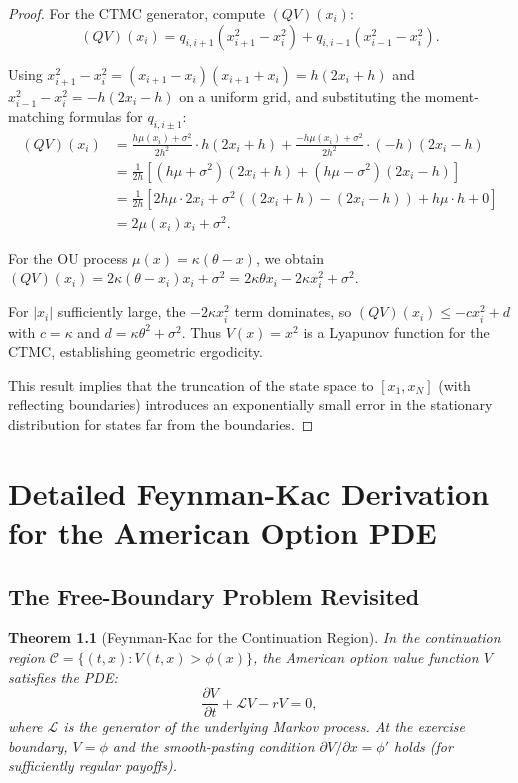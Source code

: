 \documentclass[11pt,a4paper,openany]{book}
\theoremstyle{definition}
\theoremstyle{plain}
\newtheorem{theorem}{Theorem}[chapter]
\theoremstyle{remark}
\newcommand{\1}{\mathbbm{1}}
\newcommand{\calL}{\mathcal{L}}
\newcommand{\calC}{\mathcal{C}}
\begin{document}
\begin{proof}
For the CTMC generator, compute $(Q V)(x_{i})$:
\[
(QV)(x_{i}) = q_{i,i+1}(x_{i+1}^{2} - x_{i}^{2}) + q_{i,i-1}(x_{i-1}^{2} - x_{i}^{2}).
\]

Using $x_{i+1}^{2} - x_{i}^{2} = (x_{i+1} - x_{i})(x_{i+1} + x_{i}) = h(2x_{i} + h)$ and $x_{i-1}^{2} - x_{i}^{2} = -h(2x_{i} - h)$ on a uniform grid, and substituting the moment-matching formulas for $q_{i,i\pm 1}$:
\[
\begin{aligned}
(QV)(x_{i}) &= \frac{h\mu(x_{i}) + \sigma^{2}}{2h^{2}} \cdot h(2x_{i}+h) + \frac{-h\mu(x_{i}) + \sigma^{2}}{2h^{2}} \cdot (-h)(2x_{i}-h) \\
&= \frac{1}{2h}\left[(h\mu + \sigma^{2})(2x_{i}+h) + (h\mu - \sigma^{2})(2x_{i}-h)\right] \\
&= \frac{1}{2h}\left[2h\mu \cdot 2x_{i} + \sigma^{2}((2x_{i}+h) - (2x_{i}-h)) + h\mu \cdot h + 0\right] \\
&= 2\mu(x_{i}) x_{i} + \sigma^{2}.
\end{aligned}
\]

For the OU process $\mu(x) = \kappa(\theta - x)$, we obtain $(QV)(x_{i}) = 2\kappa(\theta - x_{i})x_{i} + \sigma^{2} = 2\kappa\theta x_{i} - 2\kappa x_{i}^{2} + \sigma^{2}$.

For $|x_{i}|$ sufficiently large, the $-2\kappa x_{i}^{2}$ term dominates, so $(QV)(x_{i}) \leq -c x_{i}^{2} + d$ with $c = \kappa$ and $d = \kappa\theta^{2} + \sigma^{2}$. Thus $V(x) = x^{2}$ is a Lyapunov function for the CTMC, establishing geometric ergodicity.

This result implies that the truncation of the state space to $[x_{1}, x_{N}]$ (with reflecting boundaries) introduces an exponentially small error in the stationary distribution for states far from the boundaries.
\end{proof}

\chapter{Detailed Feynman-Kac Derivation for the American Option PDE}

\section{The Free-Boundary Problem Revisited}

\begin{theorem}[Feynman-Kac for the Continuation Region]
In the continuation region $\calC = \{(t,x) : V(t,x) > \phi(x)\}$, the American option value function $V$ satisfies the PDE:
\[
\frac{\partial V}{\partial t} + \calL V - rV = 0,
\]
where $\calL$ is the generator of the underlying Markov process. At the exercise boundary, $V = \phi$ and the smooth-pasting condition $\partial V / \partial x = \phi'$ holds (for sufficiently regular payoffs).
\end{theorem}
\end{document}

